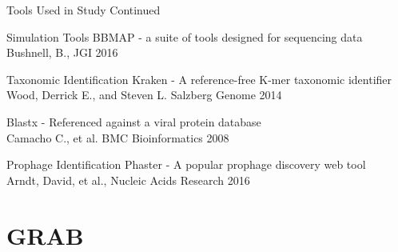 \documentclass[11pt]{beamer}
\begin{document}
	\begin{frame}{Tools Used in Study Continued}
	\begin{block}{Simulation Tools}
	BBMAP - a suite of tools designed for sequencing data \\
	\tiny{Bushnell, B., JGI 2016}
	\end{block}
	
	\begin{block}{Taxonomic Identification}
	Kraken - A reference-free K-mer taxonomic identifier \\
	\tiny{Wood, Derrick E., and Steven L. Salzberg Genome 2014}
	
	\large{Blastx - Referenced against a viral protein database} \\
	\tiny{Camacho C., et al. BMC Bioinformatics 2008}
	\end{block}
	
	\begin{block}{Prophage Identification}
	Phaster - A popular prophage discovery web tool  \\
	\tiny{Arndt, David, et al., Nucleic Acids Research 2016}
	\end{block}
	\end{frame}
	
	
\section{GRAB}
\subsection{}
	
\end{document}
